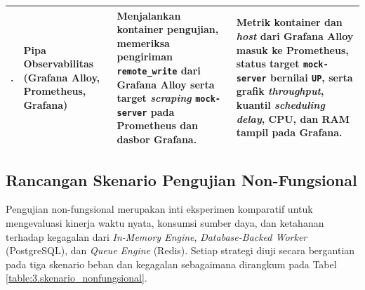 {\begin{longtable}{|>{\centering\arraybackslash}p{}|>{\raggedright\arraybackslash}p{}|>{\raggedright\arraybackslash}p{}|>{\raggedright\arraybackslash}p{}|}
	\hline
	5. & Pipa Observabilitas (Grafana Alloy, Prometheus, Grafana) & Menjalankan kontainer pengujian, memeriksa pengiriman \texttt{remote\_write} dari Grafana Alloy serta target \textit{scraping} \texttt{mock-server} pada Prometheus dan dasbor Grafana. & Metrik kontainer dan \textit{host} dari Grafana Alloy masuk ke Prometheus, status target \texttt{mock-server} bernilai \texttt{UP}, serta grafik \textit{throughput}, kuantil \textit{scheduling delay}, CPU, dan RAM tampil pada Grafana. \\
	\hline
\end{longtable}}

\subsection{Rancangan Skenario Pengujian Non-Fungsional} \label{III.Uji_NonFungsional}
Pengujian non-fungsional merupakan inti eksperimen komparatif untuk mengevaluasi kinerja waktu nyata, konsumsi sumber daya, dan ketahanan terhadap kegagalan dari \textit{In-Memory Engine}, \textit{Database-Backed Worker} (PostgreSQL), dan \textit{Queue Engine} (Redis). Setiap strategi diuji secara bergantian pada tiga skenario beban dan kegagalan sebagaimana dirangkum pada Tabel \ref{table:3.skenario_nonfungsional}. \par

